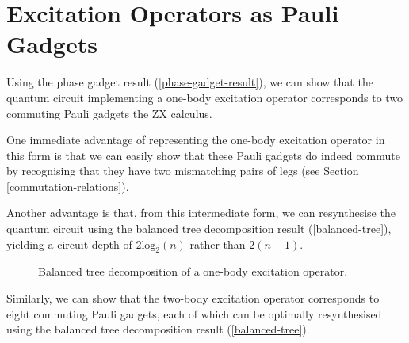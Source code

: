 \section{Excitation Operators as Pauli Gadgets}

Using the phase gadget result (\ref{phase-gadget-result}), we can show that the quantum circuit implementing a one-body excitation operator corresponds to two commuting Pauli gadgets the ZX calculus.


One immediate advantage of representing the one-body excitation operator in this form is that we can easily show that these Pauli gadgets do indeed commute by recognising that they have two mismatching pairs of legs (see Section \ref{commutation-relations}).

Another advantage is that, from this intermediate form, we can resynthesise the quantum circuit using the balanced tree decomposition result (\ref{balanced-tree}), yielding a circuit depth of $2\text{log}_2(n)$ rather than $2(n-1)$.

\begin{figure}[H]
    \centering
    \caption{Balanced tree decomposition of a one-body excitation operator.}
\end{figure}

Similarly, we can show that the two-body excitation operator corresponds to eight commuting Pauli gadgets, each of which can be optimally resynthesised using the balanced tree decomposition result (\ref{balanced-tree}).

